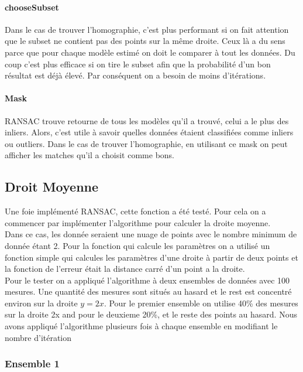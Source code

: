 \documentclass[11pt]{article}
\begin{document}
\paragraph{chooseSubset}
Dans le cas de trouver l’homographie, c’est plus performant si on fait attention que le subset ne contient pas des points sur la même droite. Ceux là a du sens parce que pour chaque modèle estimé on doit le comparer à tout les données. Du coup c'est plus efficace si on tire le subset afin que la probabilité d'un bon résultat est déjà élevé. Par conséquent on a besoin de moins d'itérations.

\paragraph{Mask}
RANSAC trouve retourne de tous les modèles qu’il a trouvé, celui a le plus des inliers. Alors, c'est utile à savoir quelles données étaient classifiées comme inliers ou outliers. Dans le cas de trouver l'homographie, en utilisant ce mask on peut afficher les matches qu’il a choisit comme bons.


\subsection{Droit Moyenne}

Une foie implémenté RANSAC, cette fonction a été testé. Pour cela on a commencer par implémenter l’algorithme pour calculer la droite moyenne. \\
Dans ce cas, les donnée seraient une nuage de points avec le nombre minimum de donnée étant 2. Pour la fonction qui calcule les paramètres on a utilisé un fonction simple qui calcules les paramètres d’une droite à partir de deux points et la fonction de l’erreur était la distance carré d’un point a la droite. \\
Pour le tester on a appliqué l’algorithme à deux ensembles de données avec 100 mesures. Une quantité des mesures sont situés au hasard et le rest est concentré environ sur la droite $y = 2x$. Pour le premier ensemble on utilise 40\% des mesures sur la droite 2x and pour le deuxieme 20\%, et le reste des points au hasard. Nous avons appliqué l'algorithme plusieurs fois à chaque ensemble en modifiant le nombre d’itération

\subsubsection{Ensemble 1}
\end{document}
